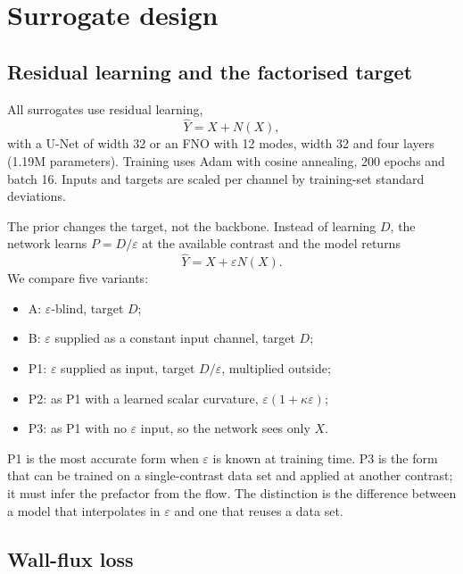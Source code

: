 \documentclass[preprint,11pt,a4paper,times,doubleblind]{elsarticle}
\begin{document}
\section{Surrogate design}
\label{sec:method}

\subsection{Residual learning and the factorised target}
\label{sec:prior}

All surrogates use residual learning,
\begin{equation}
  \hat Y=X+N(X),
  \label{eq:residual}
\end{equation}
with a U-Net of width 32 or an FNO with 12 modes, width 32 and four layers (1.19M
parameters). Training uses Adam with cosine annealing, 200 epochs and batch 16. Inputs and
targets are scaled per channel by training-set standard deviations.

The prior changes the target, not the backbone. Instead of learning $D$, the network learns
$P=D/\varepsilon$ at the available contrast and the model returns
\begin{equation}
  \hat Y=X+\varepsilon N(X).
  \label{eq:prior}
\end{equation}
We compare five variants:
\begin{itemize}
\item A: $\varepsilon$-blind, target $D$;
\item B: $\varepsilon$ supplied as a constant input channel, target $D$;
\item P1: $\varepsilon$ supplied as input, target $D/\varepsilon$, multiplied outside;
\item P2: as P1 with a learned scalar curvature, $\varepsilon(1+\kappa\varepsilon)$;
\item P3: as P1 with no $\varepsilon$ input, so the network sees only $X$.
\end{itemize}
P1 is the most accurate form when $\varepsilon$ is known at training time. P3 is the form
that can be trained on a single-contrast data set and applied at another contrast; it must
infer the prefactor from the flow. The distinction is the difference between a model that
interpolates in $\varepsilon$ and one that reuses a data set.

\subsection{Wall-flux loss}
\end{document}
